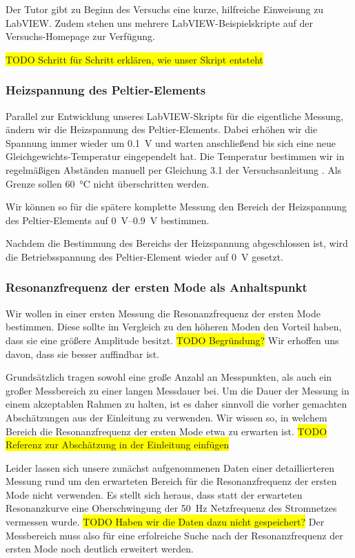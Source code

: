 Der Tutor gibt zu Beginn des Versuchs eine kurze, hilfreiche Einweisung zu LabVIEW.
Zudem stehen uns mehrere LabVIEW-Beispielskripte auf der Versuchs-Homepage zur Verfügung.

\colorbox{yellow}{TODO Schritt für Schritt erklären, wie unser Skript entsteht}

\subsubsection*{Heizspannung des Peltier-Elements}

Parallel zur Entwicklung unseres LabVIEW-Skripts für die eigentliche Messung, ändern wir die Heizspannung des Peltier-Elements.
Dabei erhöhen wir die Spannung immer wieder um \SI{0.1}{\volt} und warten anschließend bis sich eine neue Gleichgewichts-Temperatur eingependelt hat.
Die Temperatur bestimmen wir in regelmäßigen Abständen manuell per Gleichung 3.1 der Versuchsanleitung \cite{Anleitung}.
Als Grenze sollen \SI{60}{\celsius} nicht überschritten werden.

Wir können so für die spätere komplette Messung den Bereich der Heizspannung des Peltier-Elements auf \SIrange{0}{0.9}{\volt} bestimmen.

Nachdem die Bestimmung des Bereichs der Heizspannung abgeschlossen ist, wird die Betriebsspannung des Peltier-Element wieder auf \SI{0}{\volt} gesetzt.

\subsubsection*{Resonanzfrequenz der ersten Mode als Anhaltspunkt}

Wir wollen in einer ersten Messung die Resonanzfrequenz der ersten Mode bestimmen.
Diese sollte im Vergleich zu den höheren Moden den Vorteil haben, dass sie eine größere Amplitude besitzt.
\colorbox{yellow}{TODO Begründung?}
Wir erhoffen uns davon, dass sie besser auffindbar ist.

Grundsätzlich tragen sowohl eine große Anzahl an Messpunkten, als auch ein großer Messbereich zu einer langen Messdauer bei.
Um die Dauer der Messung in einem akzeptablen Rahmen zu halten, ist es daher sinnvoll die vorher gemachten Abschätzungen aus der Einleitung zu verwenden.
Wir wissen so, in welchem Bereich die Resonanzfrequenz der ersten Mode etwa zu erwarten ist.
\colorbox{yellow}{TODO Referenz zur Abschätzung in der Einleitung einfügen}

Leider lassen sich unsere zunächst aufgenommenen Daten einer detaillierteren Messung rund um den erwarteten Bereich für die Resonanzfrequenz der ersten Mode nicht verwenden.
Es stellt sich heraus, dass statt der erwarteten Resonanzkurve eine Oberschwingung der \SI{50}{\hertz} Netzfrequenz des Stromnetzes vermessen wurde.
\colorbox{yellow}{TODO Haben wir die Daten dazu nicht gespeichert?}
Der Messbereich muss also für eine erfolreiche Suche nach der Resonanzfrequenz der ersten Mode noch deutlich erweitert werden.

